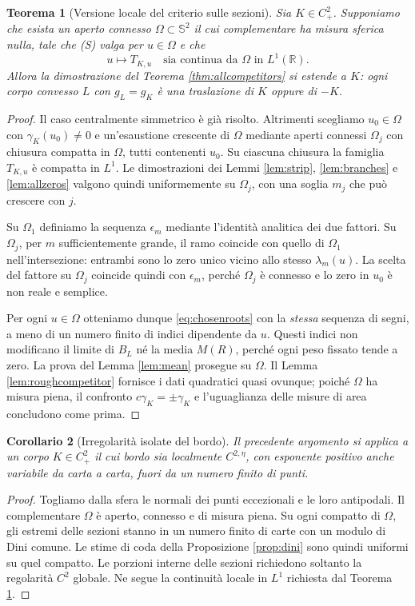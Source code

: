 \documentclass[11pt,a4paper]{article}
\newtheorem{theorem}{Teorema}
\newtheorem{corollary}[theorem]{Corollario}
\theoremstyle{remark}
\newcommand{\R}{\mathbb R}
\newcommand{\Sph}{\mathbb S^2}
\begin{document}
\begin{theorem}[Versione locale del criterio sulle sezioni]\label{thm:localU}
Sia $K\in C^2_+$. Supponiamo che esista un aperto connesso
$\Omega\subset\Sph$ il cui complementare ha misura sferica nulla,
tale che (S) valga per $u\in\Omega$ e che
\[
u\longmapsto T_{K,u}\quad\text{sia continua da }\Omega\text{ in }L^1(\R).
\]
Allora la dimostrazione del Teorema \ref{thm:allcompetitors} si estende
a $K$: ogni corpo convesso $L$ con $g_L=g_K$ è una traslazione di
$K$ oppure di $-K$.
\end{theorem}
\begin{proof}
Il caso centralmente simmetrico è già risolto. Altrimenti scegliamo
$u_0\in\Omega$ con $\gamma_K(u_0)\ne0$ e un'esaustione crescente di
$\Omega$ mediante aperti connessi $\Omega_j$ con chiusura compatta in
$\Omega$, tutti contenenti $u_0$.
Su ciascuna chiusura la famiglia $T_{K,u}$ è compatta in $L^1$.
Le dimostrazioni dei Lemmi \ref{lem:strip}, \ref{lem:branches} e
\ref{lem:allzeros} valgono quindi uniformemente su $\Omega_j$, con
una soglia $m_j$ che può crescere con $j$.

Su $\Omega_1$ definiamo la sequenza $\epsilon_m$ mediante l'identità
analitica dei due fattori. Su $\Omega_j$, per $m$ sufficientemente
grande, il ramo coincide con quello di $\Omega_1$ nell'intersezione:
entrambi sono lo zero unico vicino allo stesso $\lambda_m(u)$.
La scelta del fattore su $\Omega_j$ coincide quindi con $\epsilon_m$,
perché $\Omega_j$ è connesso e lo zero in $u_0$ è non reale e semplice.

Per ogni $u\in\Omega$ otteniamo dunque \eqref{eq:chosenroots} con la
\emph{stessa} sequenza di segni, a meno di un numero finito di indici
dipendente da $u$. Questi indici non modificano il limite di
$B_L$ né la media $M(R)$, perché ogni peso fissato tende a zero.
La prova del Lemma \ref{lem:mean} prosegue su $\Omega$. Il Lemma
\ref{lem:roughcompetitor} fornisce i dati quadratici quasi ovunque;
poiché $\Omega$ ha misura piena, il confronto $c\gamma_K=\pm\gamma_K$
e l'uguaglianza delle misure di area concludono come prima.
\end{proof}

\begin{corollary}[Irregolarità isolate del bordo]\label{cor:isolated}
Il precedente argomento si applica a un corpo $K\in C^2_+$ il cui
bordo sia localmente $C^{2,\eta}$, con esponente positivo anche variabile
da carta a carta, fuori da un numero finito di punti.
\end{corollary}
\begin{proof}
Togliamo dalla sfera le normali dei punti eccezionali e le loro
antipodali. Il complementare $\Omega$ è aperto, connesso e di misura
piena. Su ogni compatto di $\Omega$, gli estremi delle sezioni stanno
in un numero finito di carte con un modulo di Dini comune.
Le stime di coda della Proposizione \ref{prop:dini} sono quindi
uniformi su quel compatto. Le porzioni interne delle sezioni richiedono
soltanto la regolarità $C^2$ globale. Ne segue la continuità locale
in $L^1$ richiesta dal Teorema \ref{thm:localU}.
\end{proof}
\end{document}
